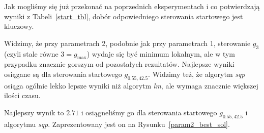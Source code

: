 \documentclass[11pt]{article}
\begin{document}
Jak mogliśmy się już przekonać na poprzednich eksperymentach i co potwierdzają wyniki z Tabeli~\ref{start_tbl}, dobór odpowiedniego sterowania startowego jest kluczowy.

Widzimy, że przy parametrach 2, podobnie jak przy parametrach 1, sterowanie $g_3$ (czyli stale równe $3 = g_{\max}$) wydaje się być minimum lokalnym, ale w tym przypadku znacznie gorszym od pozostałych rezultatów. Najlepsze wyniki osiągane są dla sterowania startowego $g_{0.55,42.5}$. Widzimy też, że algorytm {\it sqp\/} osiąga ogólnie lekko lepsze wyniki niż algorytm {\it lm}, ale wymaga znacznie większej ilości czasu.

Najlepszy wynik to $2.71$ i osiągneliśmy go dla sterowania startowego $g_{0.55,42.5}$ i algorytmu {\it sqp}. Zaprezentowany jest on na Rysunku~\ref{param2_best_sol}.
\end{document}
